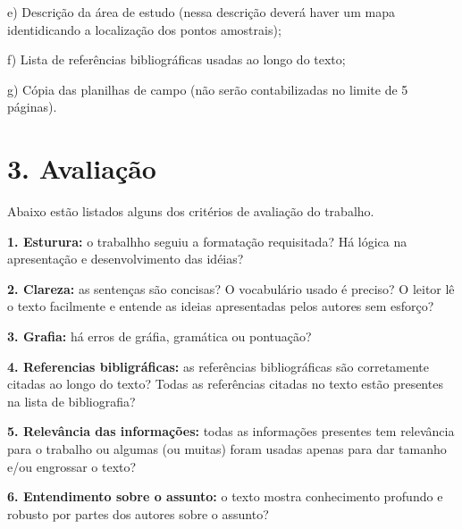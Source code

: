 \documentclass[a4paper,10pt]{article}
\begin{document}
    e) Descrição da área de estudo (nessa descrição deverá haver um mapa identidicando a localização dos pontos amostrais);
  
    f) Lista de referências bibliográficas usadas ao longo do texto; 
    
    g) Cópia das planilhas de campo (não serão contabilizadas no limite de 5 páginas).
  
  \section* {3. Avaliação}
  
    Abaixo estão listados alguns dos critérios de avaliação do trabalho.
    
    \textbf{1. Esturura:} o trabalhho seguiu a formatação requisitada? Há lógica na apresentação e desenvolvimento das idéias? 
    
    \textbf{2. Clareza:} as sentenças são concisas? O vocabulário usado é preciso? O leitor lê o texto facilmente e entende as ideias apresentadas pelos autores sem esforço?
    
    \textbf{3. Grafia:} há erros de gráfia, gramática ou pontuação? 
    
    \textbf{4. Referencias bibligráficas:} as referências bibliográficas são corretamente citadas ao longo do texto? Todas as referências citadas no texto estão presentes na lista de bibliografia? 
    
    \textbf{5. Relevância das informações:} todas as informações presentes tem relevância para o trabalho ou algumas (ou muitas) foram usadas apenas para dar tamanho e/ou engrossar o texto? 
    
    \textbf{6. Entendimento sobre o assunto:} o texto mostra conhecimento profundo e robusto por partes dos autores sobre o assunto? 
  
  \clearpage %
\end{document}
